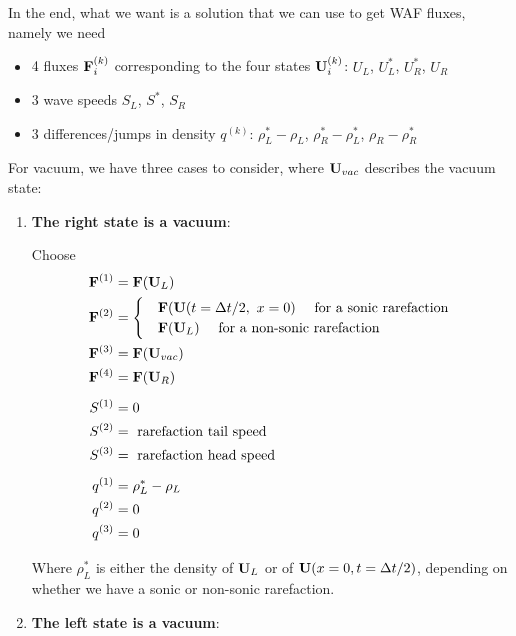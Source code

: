 In the end, what we want is a solution that we can use to get WAF fluxes, namely we need

\begin{itemize}
	\item 4 fluxes $\mathbf{F}_{i}^{(k)}$ corresponding to the four states $\mathbf{U}_{i}^{(k)}$: $U_L$, $U_L^*$, $U_R^*$, $U_R$
	\item 3 wave speeds $S_L$, $S^*$, $S_R$
	\item 3 differences/jumps in density $q^{(k)}$: $\rho_L^* - \rho_L$, $\rho_R^* - \rho_L^*$, $\rho_R - \rho_R^*$
\end{itemize}

For vacuum, we have three cases to consider, where $\mathbf{U}_{vac}$ describes the vacuum state:


\begin{enumerate}

	\item 	\textbf{The right state is a vacuum}:
	
			Choose 
			\begin{align*}
				\mathbf{F}^{(1)} &= \mathbf{F}(\mathbf{U}_L)\\
				\mathbf{F}^{(2)} &= \begin{cases}
								&\mathbf{F}(\mathbf{U}(t = \Delta t/2, \ x = 0) \quad \text{ for a sonic rarefaction } \\
								&\mathbf{F}(\mathbf{U}_L) \quad \text{ for a non-sonic rarefaction } \\
							\end{cases}\\
				\mathbf{F}^{(3)} &= \mathbf{F}(\mathbf{U}_{vac})\\
				\mathbf{F}^{(4)} &= \mathbf{F}(\mathbf{U}_R)\\[.5em]
				S^{(1)} &= 0\\
				S^{(2)} &= \text{ rarefaction tail speed}\\
				S^{(3)} &= \text{ rarefaction head speed}\\[.5em]
				q^{(1)} &= \rho^*_L - \rho_L\\
				q^{(2)} &= 0\\
				q^{(3)} &= 0\\							
			\end{align*}
			
			Where $\rho^*_L$ is either the density of $\mathbf{U}_L$ or of $\mathbf{U}(x = 0, t = \Delta t/2)$, depending on whether we have a sonic or non-sonic rarefaction.

	
	\item 	\textbf{The left state is a vacuum}:
			

\end{enumerate}
